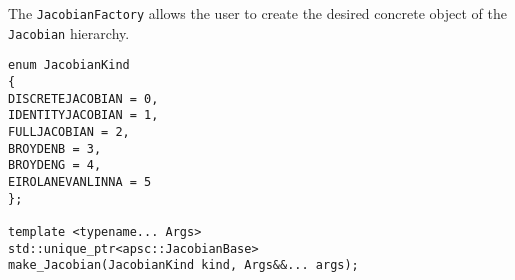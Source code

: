 \documentclass{article}
\newcommand{\li}{\lstinline}
\newcommand{\cpp}[1]{\li!#1!}
\begin{document}
The \cpp{JacobianFactory} allows the user to create the desired concrete object of the \cpp{Jacobian} hierarchy.
\begin{lstlisting}
enum JacobianKind
{
DISCRETEJACOBIAN = 0,
IDENTITYJACOBIAN = 1,
FULLJACOBIAN = 2,
BROYDENB = 3,
BROYDENG = 4,
EIROLANEVANLINNA = 5
};

template <typename... Args>
std::unique_ptr<apsc::JacobianBase>
make_Jacobian(JacobianKind kind, Args&&... args);
\end{lstlisting} 
\end{document}
